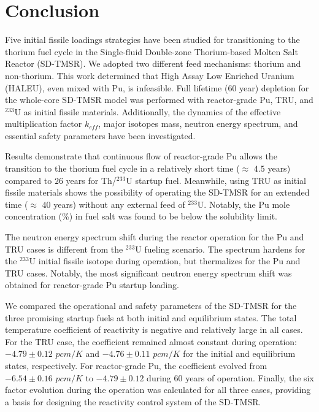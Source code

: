 \section{Conclusion} \label{Conclusion}
Five initial fissile loadings strategies have been studied for 
transitioning to the thorium fuel cycle in the Single-fluid Double-zone 
Thorium-based Molten Salt Reactor (SD-TMSR). We 
adopted two different feed mechanisms: thorium and non-thorium. 
This work determined that High Assay Low Enriched Uranium (HALEU), even mixed with Pu, is infeasible. 
Full lifetime (60 year) depletion for the whole-core SD-TMSR model was 
performed with reactor-grade Pu, TRU, and $^{233}$U as initial fissile 
materials. Additionally, the dynamics of the effective multiplication factor 
$k_{eff}$, major isotopes mass, neutron energy spectrum, and essential safety 
parameters have been investigated. 

Results demonstrate that continuous flow of reactor-grade Pu allows the 
transition to the thorium fuel cycle in a relatively short time ($\approx$ 
$4.5$ years) compared to $26$ years for Th/$^{233}$U startup fuel. 
Meanwhile, using \gls{TRU} as initial fissile materials shows the possibility 
of operating the SD-TMSR for an extended time ($\approx$ $40$ years) 
without any external feed of $^{233}$U. Notably, the Pu mole concentration (\%) in 
fuel salt was found to be below the solubility limit. 

The neutron energy spectrum shift during the reactor operation 
for the Pu and TRU cases is different from the $^{233}$U fueling scenario. 
The spectrum hardens for the $^{233}$U initial fissile isotope during 
operation, but thermalizes for the Pu and TRU cases. Notably, the most 
significant neutron energy spectrum shift was obtained for reactor-grade Pu 
startup loading. 

We compared the operational and safety parameters of the \gls{SD-TMSR} for the 
three promising startup fuels at both initial and equilibrium states. The total 
temperature coefficient of reactivity is negative and relatively large in all 
cases. For the TRU case, the coefficient remained almost constant during 
operation: $-4.79\pm0.12$ $pcm/K$ and $-4.76\pm0.11$ $pcm/K$ for the initial 
and equilibrium states, respectively. For reactor-grade Pu, the coefficient 
evolved from $-6.54\pm0.16$ $pcm/K$ to $-4.79\pm0.12$ during 
60 years of operation. Finally, the six factor evolution during the operation 
was calculated for all three cases, providing a basis for designing the reactivity control system of the \gls{SD-TMSR}.

